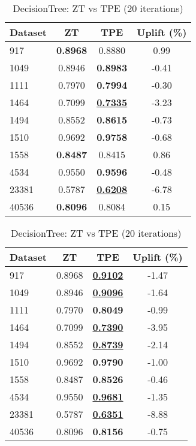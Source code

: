 \begin{table}[htbp]
\begin{center}
\begin{small}
\begin{sc}
\begin{subtable}[t]{0.48\textwidth}
    \centering
    \caption{DecisionTree: ZT vs TPE (10 iterations)}
    \label{tab:decisiontree-zt-vs-tpe-10}
    \begin{tabular}{lccc}
    \toprule
    \textbf{Dataset} & \textbf{ZT} & \textbf{TPE} & \textbf{Uplift (\%)} \\
    \midrule
    917    & \textbf{0.8968} & 0.8880 & 0.99 \\
    1049    & 0.8946 & \textbf{0.8983} & -0.41 \\
    1111    & 0.7970 & \textbf{0.7994} & -0.30 \\
    1464    & 0.7099 & \underline{\textbf{0.7335}} & -3.23 \\
    1494    & 0.8552 & \textbf{0.8615} & -0.73 \\
    1510    & 0.9692 & \textbf{0.9758} & -0.68 \\
    1558    & \textbf{0.8487} & 0.8415 & 0.86 \\
    4534    & 0.9550 & \textbf{0.9596} & -0.48 \\
    23381    & 0.5787 & \underline{\textbf{0.6208}} & -6.78 \\
    40536    & \textbf{0.8096} & 0.8084 & 0.15 \\
    \bottomrule
    \end{tabular}
\end{subtable}
\hfill
\begin{subtable}[t]{0.48\textwidth}
    \centering
    \caption{DecisionTree: ZT vs TPE (20 iterations)}
    \label{tab:decisiontree-zt-vs-tpe-20}
    \begin{tabular}{lccc}
    \toprule
    \textbf{Dataset} & \textbf{ZT} & \textbf{TPE} & \textbf{Uplift (\%)} \\
    \midrule
    917    & 0.8968 & \underline{\textbf{0.9102}} & -1.47 \\
    1049    & 0.8946 & \underline{\textbf{0.9096}} & -1.64 \\
    1111    & 0.7970 & \textbf{0.8049} & -0.99 \\
    1464    & 0.7099 & \underline{\textbf{0.7390}} & -3.95 \\
    1494    & 0.8552 & \underline{\textbf{0.8739}} & -2.14 \\
    1510    & 0.9692 & \textbf{0.9790} & -1.00 \\
    1558    & 0.8487 & \textbf{0.8526} & -0.46 \\
    4534    & 0.9550 & \underline{\textbf{0.9681}} & -1.35 \\
    23381    & 0.5787 & \underline{\textbf{0.6351}} & -8.88 \\
    40536    & 0.8096 & \textbf{0.8156} & -0.75 \\
    \bottomrule
    \end{tabular}
\end{subtable}

\end{sc}
\end{small}
\end{center}
\vskip -0.1in
\end{table}